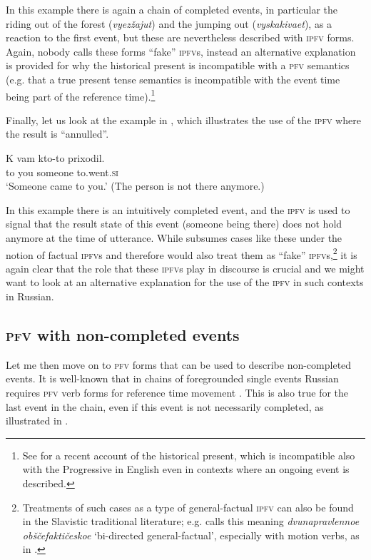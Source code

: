 \documentclass[output=paper]{langscibook}
\begin{document}
\noindent In this example there is again a chain of completed events, in particular the riding out of the forest (\textit{vyezžajut}) and the jumping out (\textit{vyskakivaet}), as a reaction to the first event, but these are nevertheless described with \textsc{ipfv} forms. Again, nobody calls these forms ``fake'' \textsc{ipfv}s, instead an alternative explanation is provided for why the historical present is incompatible with a \textsc{pfv} semantics (e.g. that a true present tense semantics is incompatible with the event time being part of the reference time).\footnote{See \citet{anand+19} for a recent account of the historical present, which is incompatible also with the Progressive in English even in contexts where an ongoing event is described.}  

Finally, let us look at the example in  \citep[after][311]{smith91}, which illustrates the use of the \textsc{ipfv} where the result is ``annulled''.

\ea\label{gehr:ex:anres}
{\gll K vam kto-to prixodil.\\
    to you someone to.went.\textsc{si}\\
\glt `Someone came to you.' (The person is not there anymore.)}\label{gehr:ex:prixodil}		
\z

\noindent In this example there is an intuitively completed event, and the \textsc{ipfv} is used to signal that the result state of this event (someone being there) does not hold anymore at the time of utterance. While \citet{gronndiss,gronn15} subsumes cases like these under the notion of factual \textsc{ipfv}s and therefore would also treat them as ``fake'' \textsc{ipfv}s,\footnote{Treatments of such cases as a type of general-factual \textsc{ipfv} can also be found in the Slavistic traditional literature; e.g. \citet{paduceva96} calls this meaning \textit{dvunapravlennoe obščefaktičeskoe} `bi-directed general-factual', especially with motion verbs, as in .} it is again clear that the role that these \textsc{ipfv}s play in discourse is crucial and we might want to look at an alternative explanation for the use of the \textsc{ipfv} in such contexts in Russian. 

\subsection{\textsc{pfv} with non-completed events}

Let me then move on to \textsc{pfv} forms that can be used to describe non-completed events. It is well-known that in chains of foregrounded single events Russian requires \textsc{pfv} verb forms for reference time movement \citep[in the sense of][]{kampreyle} \citep[see also][]{borik02}. This is also true for the last event in the chain, even if this event is not necessarily completed, as illustrated in .
\end{document}
